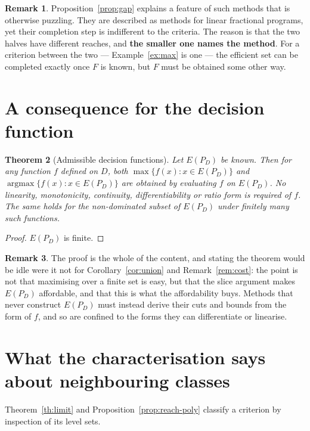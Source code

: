 \documentclass[11pt,a4paper]{article}
\newcommand{\Dset}{D}
\newcommand{\E}{E(P_{\Dset})}
\theoremstyle{plain}
\newtheorem{theorem}{Theorem}
\theoremstyle{definition}
\newtheorem{remark}[theorem]{Remark}
\begin{document}
\begin{remark}
Proposition~\ref{prop:gap} explains a feature of such methods that is otherwise
puzzling.  They are described as methods for linear fractional programs, yet
their completion step is indifferent to the criteria.  The reason is that the
two halves have different reaches, and \textbf{the smaller one names the
method}.  For a criterion between the two --- Example~\ref{ex:max} is one ---
the efficient set can be completed exactly once $F$ is known, but $F$ must be
obtained some other way.
\end{remark}

\section{A consequence for the decision function}

\begin{theorem}[Admissible decision functions]\label{th:admissible}
Let $\E$ be known.  Then for any function $f$ defined on $\Dset$, both
$\max\{f(x) : x \in \E\}$ and $\operatorname*{argmax}\{f(x) : x \in \E\}$ are
obtained by evaluating $f$ on $\E$.  No linearity, monotonicity, continuity,
differentiability or ratio form is required of $f$.  The same holds for the
non-dominated subset of $\E$ under finitely many such functions.
\end{theorem}

\begin{proof}
$\E$ is finite.
\end{proof}

\begin{remark}
The proof is the whole of the content, and stating the theorem would be idle
were it not for Corollary~\ref{cor:union} and Remark~\ref{rem:cost}: the point
is not that maximising over a finite set is easy, but that the slice argument
makes $\E$ affordable, and that this is what the affordability buys.  Methods
that never construct $\E$ must instead derive their cuts and bounds from the
form of $f$, and so are confined to the forms they can differentiate or
linearise.
\end{remark}

\section{What the characterisation says about neighbouring classes}

Theorem~\ref{th:limit} and Proposition~\ref{prop:reach-poly} classify a
criterion by inspection of its level sets.
\end{document}
